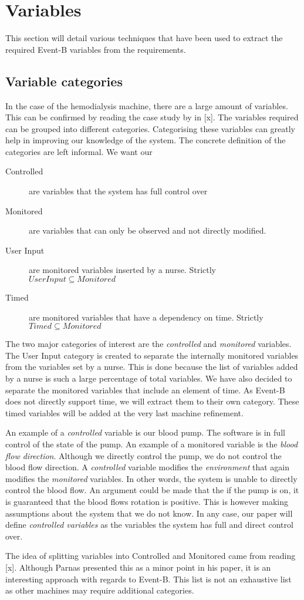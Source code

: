\section{Variables}
This section will detail various techniques that have been used to extract the required Event-B variables from the requirements.

\subsection{Variable categories}
In the case of the hemodialysis machine, there are a large amount of variables. This can be confirmed by reading the case study by in [x]. The variables required can be grouped into different categories. Categorising these variables can greatly help in improving our knowledge of the system. The concrete definition of the categories are left informal. We want our 
\begin{description}
\item [Controlled] are variables that the system has full control over
\item [Monitored] are variables that can only be observed and not directly modified.
\item [User Input] are monitored variables inserted by a nurse. Strictly $User Input \subseteq Monitored$
\item [Timed] are monitored variables that have a dependency on time. Strictly $Timed \subseteq Monitored$
\end{description}
The two major categories of interest are the \textit{controlled} and \textit{monitored} variables. The User Input category is created to separate the internally monitored variables from the variables set by a nurse. This is done because the list of variables added by a nurse is such a large percentage of total variables. We have also decided to separate the monitored variables that include an element of time. As Event-B does not directly support time, we will extract them to their own category. These timed variables will be added at the very last machine refinement. 

An example of a \textit{controlled} variable is our blood pump. The software is in full control of the state of the pump. An example of a monitored variable is the \textit{blood flow direction}. Although we directly control the pump, we do not control the blood flow direction. A \textit{controlled} variable modifies the \textit{environment} that again modifies the \textit{monitored} variables. In other words, the system is unable to directly control the blood flow. An argument could be made that the if the pump is on, it is guaranteed that the blood flows rotation is positive. This is however making assumptions about the system that we do not know. In any case, our paper will define \textit{controlled variables} as the variables the system has full and direct control over.

The idea of splitting variables into Controlled and Monitored came from reading [x]. Although Parnas presented this as a minor point in his paper, it is an interesting approach with regards to Event-B.
This list is not an exhaustive list as other machines may require additional categories.
